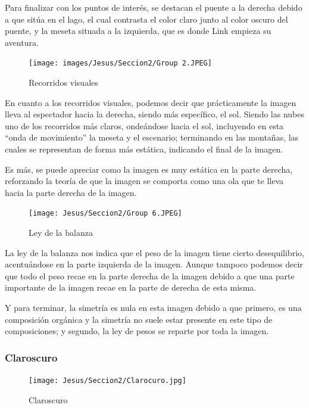 \documentclass[12pt]{article}
\begin{document}
          Para finalizar con los puntos de interés, se destacan el puente a la derecha debido a que sitúa en el lago, el cual contrasta el color claro junto al color oscuro del puente, y la meseta situada a la izquierda, que es donde Link empieza su aventura.
          
         \newpage
          \begin{figure}[H]
            \centering
            \texttt{[image: images/Jesus/Seccion2/Group 2.JPEG]}
            \caption{Recorridos visuales}
          \end{figure}
          En cuanto a los recorridos visuales, podemos decir que prácticamente la imagen lleva al espectador hacia la derecha, siendo más específico, el sol. 
          Siendo las nubes uno de los recorridos más claros, ondeándose hacia el sol, incluyendo en esta “onda de movimiento” la meseta y el escenario; terminando en las montañas, las cuales se representan de forma más estática, indicando el final de la imagen. 

          Es más, se puede apreciar como la imagen es muy estática en la parte derecha, reforzando la teoría de que la imagen se comporta como una ola que te lleva hacia la parte derecha de la imagen.
          \newpage

          \begin{figure}[H]
            \centering
            \texttt{[image: Jesus/Seccion2/Group 6.JPEG]}
            \caption{Ley de la balanza}
          \end{figure}
          
          La ley de la balanza nos indica que el peso de la imagen tiene cierto desequilibrio, acentuándose en la parte izquierda de la imagen.
          Aunque tampoco podemos decir que todo el peso recae en la parte derecha de la imagen debido a que una parte importante de la imagen recae en la parte de derecha de esta misma. 

          Y para terminar, la simetría es nula en esta imagen debido a que primero, es una composición orgánica y la simetría no suele estar presente en este tipo de composiciones; y segundo, la ley de pesos se reparte por toda la imagen. 
          \newpage
        \subsubsection{Claroscuro}
          \begin{figure}[H]
            \centering
            \texttt{[image: Jesus/Seccion2/Clarocuro.jpg]}
            \caption{Claroscuro}
          \end{figure}
\end{document}
